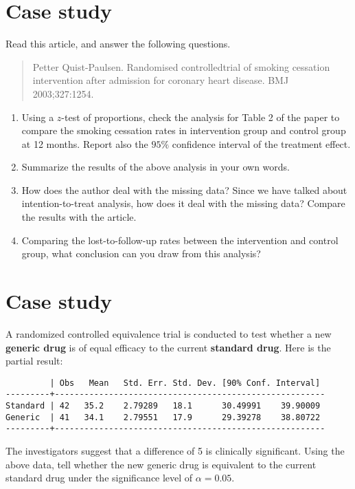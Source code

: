 \documentclass[a4paper,11pt]{article}
\begin{document}
\begin{CJK*}{UTF8}{gbsn}
\section{Case study}
Read this article, and answer the following questions.\\
\begin{quote}
Petter Quist-Paulsen. Randomised controlledtrial of smoking cessation 
intervention after admission for coronary heart disease. BMJ 2003;327:1254.
\end{quote}
\begin{enumerate}[(1)]
	\item Using a $z$-test of proportions, check the analysis for Table 2 of 
		the paper to compare the smoking cessation rates in intervention 
		group and control group at 12 months. Report also the $95\%$ 
		confidence interval of the treatment effect.
	\item Summarize the results of the above analysis in your own words.
	\item How does the author deal with the missing data? Since we have talked about 
		intention-to-treat analysis, how does it deal with the missing data? 
		Compare the results with the article.
	\item Comparing the lost-to-follow-up rates between the intervention and 
		control group, what conclusion can you draw from this analysis? 
\end{enumerate}


\section{Case study}
A randomized controlled equivalence trial is conducted to test whether a new \textbf{generic 
drug} is of equal efficacy to the current \textbf{standard drug}. Here is the partial result:
\begin{verbatim}
         | Obs   Mean   Std. Err. Std. Dev. [90% Conf. Interval]
---------+-------------------------------------------------------
Standard | 42   35.2    2.79289   18.1      30.49991    39.90009
Generic  | 41   34.1    2.79551   17.9      29.39278    38.80722
---------+-------------------------------------------------------
\end{verbatim}
The investigators suggest that a difference of 5 is clinically significant. Using the above 
data, tell whether the new generic drug is equivalent to the current standard drug under the 
significance level of $\alpha=0.05$.

\end{CJK*}
\end{document}

